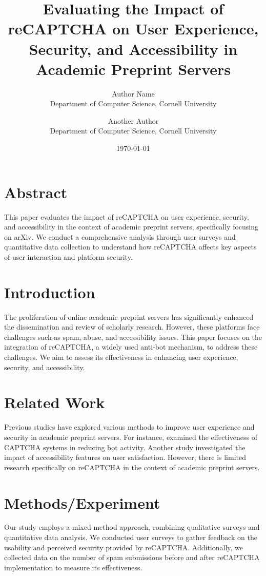 \documentclass{article}
\title{Evaluating the Impact of reCAPTCHA on User Experience, Security, and Accessibility in Academic Preprint Servers}
\author{Author Name \\
Department of Computer Science, Cornell University \\
\and Another Author \\
Department of Computer Science, Cornell University}
\date{\today}
\begin{document}
\maketitle

\section{Abstract}
This paper evaluates the impact of reCAPTCHA on user experience, security, and accessibility in the context of academic preprint servers, specifically focusing on arXiv. We conduct a comprehensive analysis through user surveys and quantitative data collection to understand how reCAPTCHA affects key aspects of user interaction and platform security.

\section{Introduction}
\label{sec:introduction}
The proliferation of online academic preprint servers has significantly enhanced the dissemination and review of scholarly research. However, these platforms face challenges such as spam, abuse, and accessibility issues. This paper focuses on the integration of reCAPTCHA, a widely used anti-bot mechanism, to address these challenges. We aim to assess its effectiveness in enhancing user experience, security, and accessibility.

\section{Related Work}
\label{sec:related_work}
Previous studies have explored various methods to improve user experience and security in academic preprint servers. For instance, \cite{example1} examined the effectiveness of CAPTCHA systems in reducing bot activity. Another study \cite{example2} investigated the impact of accessibility features on user satisfaction. However, there is limited research specifically on reCAPTCHA in the context of academic preprint servers.

\section{Methods/Experiment}
\label{sec:methods}
Our study employs a mixed-method approach, combining qualitative surveys and quantitative data analysis. We conducted user surveys to gather feedback on the usability and perceived security provided by reCAPTCHA. Additionally, we collected data on the number of spam submissions before and after reCAPTCHA implementation to measure its effectiveness.
\end{document}
